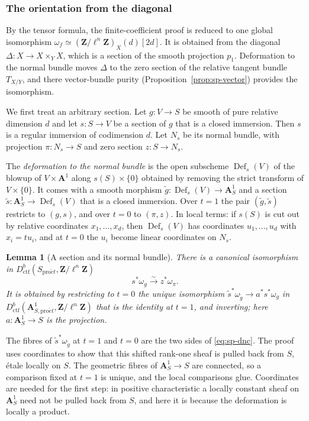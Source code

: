 \documentclass[11pt,a4paper]{article}
\numberwithin{equation}{section}
\newtheorem{lemma}[theorem]{Lemma}
\theoremstyle{definition}
\theoremstyle{remark}
\newcommand{\proet}{\mathrm{pro}\acute{e}t}
\newcommand{\Dctf}{D^b_{\mathrm{ctf}}}
\begin{document}
\subsubsection{The orientation from the diagonal}

By the tensor formula, the finite-coefficient proof is reduced to one
global isomorphism $\omega_f\simeq(\mathbf Z/\ell^n\mathbf Z)_X(d)[2d]$.
It is obtained from the diagonal
$\Delta:X\to X\times_YX$, which is a section of the smooth projection
$p_1$. Deformation to the normal bundle moves $\Delta$ to the zero
section of the relative tangent bundle $T_{X/Y}$, and there
vector-bundle purity (Proposition~\ref{prop:sp-vector}) provides the
isomorphism.

We first treat an arbitrary section. Let $g:V\to S$ be smooth of pure
relative dimension $d$ and let $s:S\to V$ be a section of $g$ that is a
closed immersion. Then $s$ is a regular immersion of codimension $d$.
Let $N_s$ be its normal bundle, with projection $\pi:N_s\to S$ and zero
section $z:S\to N_s$.

The \emph{deformation to the normal bundle} is the open subscheme
$\operatorname{Def}_s(V)$ of the blowup of $V\times\mathbf A^1$ along
$s(S)\times\{0\}$ obtained by removing the strict transform of
$V\times\{0\}$. It comes with a smooth morphism
$\widetilde g:\operatorname{Def}_s(V)\to\mathbf A^1_S$ and a section
$\widetilde s:\mathbf A^1_S\to\operatorname{Def}_s(V)$ that is a closed
immersion. Over $t=1$ the pair $(\widetilde g,\widetilde s)$ restricts
to $(g,s)$, and over $t=0$ to $(\pi,z)$. In local terms: if $s(S)$ is
cut out by relative coordinates $x_1,\ldots,x_d$, then
$\operatorname{Def}_s(V)$ has coordinates $u_1,\ldots,u_d$ with
$x_i=tu_i$, and at $t=0$ the $u_i$ become linear coordinates on $N_s$.

\begin{lemma}[A section and its normal bundle]\label{lem:sp-dnc}
There is a canonical isomorphism in
$\Dctf(S_{\proet},\mathbf Z/\ell^n\mathbf Z)$
\begin{equation}\label{eq:sp-dnc}
 s^{*}\omega_{g}\xrightarrow{\sim}z^{*}\omega_{\pi}.
\end{equation}
It is obtained by restricting to $t=0$ the unique isomorphism
$\widetilde s^{*}\omega_{\widetilde g}\to a^{*}s^{*}\omega_{g}$ in
$\Dctf(\mathbf A^1_{S,\proet},\mathbf Z/\ell^n\mathbf Z)$ that is the identity at $t=1$, and inverting; here
$a:\mathbf A^1_S\to S$ is the projection.
\end{lemma}

The fibres of $\widetilde s^{*}\omega_{\widetilde g}$ at $t=1$ and $t=0$
are the two sides of \eqref{eq:sp-dnc}. The proof uses coordinates to
show that this shifted rank-one sheaf is pulled back from $S$, \'etale
locally on $S$. The geometric fibres of $\mathbf A^1_S\to S$ are
connected, so a comparison fixed at $t=1$ is unique, and the local
comparisons glue. Coordinates are needed for the first step: in
positive characteristic a locally constant sheaf on $\mathbf A^1_S$ need
not be pulled back from $S$, and here it is because the deformation is
locally a product.
\end{document}
